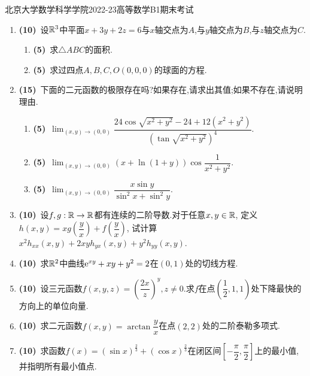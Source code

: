 \documentclass{ctexart}
\begin{document}
\pagestyle{empty}

\begin{center}\Large
    北京大学数学科学学院2022-23高等数学B1期末考试
\end{center}
\begin{enumerate}[leftmargin=*,label=\textbf{\arabic*.}]
    \item \textbf{(10)}\ 设$\mathbb{R}^3$中平面$x+3y+2z=6$与$x$轴交点为$A$,与$y$轴交点为$B$,与$z$轴交点为$C$.
        \begin{enumerate}[label=\textbf{(\arabic*)},leftmargin=*]
            \item \textbf{(5)}\ 求$\triangle ABC$的面积.
            \item \textbf{(5)}\ 求过四点$A,B,C,O(0,0,0)$的球面的方程.
        \end{enumerate}
    \item \textbf{(15)}\ 下面的二元函数的极限存在吗?如果存在,请求出其值;如果不存在,请说明理由.
        \begin{enumerate}[label=\textbf{(\arabic*)},leftmargin=*]
            \item \textbf{(5)}\ $\displaystyle\lim_{(x,y)\to(0,0)}\dfrac{24\cos\sqrt{x^2+y^2}-24+12\left(x^2+y^2\right)}{\left(\tan\sqrt{x^2+y^2}\right)^4}$.
            \item \textbf{(5)}\ $\displaystyle\lim_{(x,y)\to(0,0)}\left(x+\ln(1+y)\right)\cos\dfrac{1}{x^2+y^2}$.
            \item \textbf{(5)}\ $\displaystyle\lim_{(x,y)\to(0,0)}\dfrac{x\sin y}{\sin^2x+\sin^2y}$.
        \end{enumerate}
    \item \textbf{(10)}\ 设$f,g:\mathbb{R}\to\mathbb{R}$都有连续的二阶导数.对于任意$x,y\in\mathbb{R}$,
        定义$h(x,y)=xg\left(\dfrac{y}{x}\right)+f\left(\dfrac{y}{x}\right)$,
        试计算$x^2h_{xx}(x,y)+2xyh_{yx}(x,y)+y^2h_{yy}(x,y)$.
    \item \textbf{(10)}\ 求$\mathbb{R}^2$中曲线$\mathrm{e}^{xy}+xy+y^2=2$在$(0,1)$处的切线方程.
    \item \textbf{(10)}\ 设三元函数$f(x,y,z)=\left(\dfrac{2x}{z}\right)^{y},z\neq0$.求$f$在点$\left(\dfrac{1}{2},1,1\right)$处下降最快的方向上的单位向量.
    \item \textbf{(10)}\ 求二元函数$f(x,y)=\arctan\dfrac{y}{x}$在点$(2,2)$处的二阶泰勒多项式.
    \item \textbf{(10)}\ 求函数$f(x)=\left(\sin x\right)^{\frac{2}{3}}+\left(\cos x\right)^{\frac{2}{3}}$在闭区间$\left[-\dfrac{\pi}{2},\dfrac{\pi}{2}\right]$上的最小值,并指明所有最小值点.

\end{enumerate}
\end{document}
